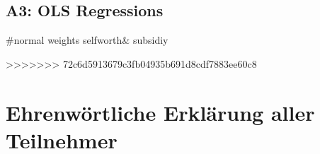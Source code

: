 \documentclass[12pt, a4paper, titlepage]{article}\usepackage[]{graphicx}\usepackage[]{color}
\begin{document}
\subsection{A3: OLS Regressions}

#normal weights selfworth& subsidiy


% 
>>>>>>> 72c6d5913679c3fb04935b691d8cdf7883ee60c8

\section{Ehrenwörtliche Erklärung aller Teilnehmer}
\end{document}

